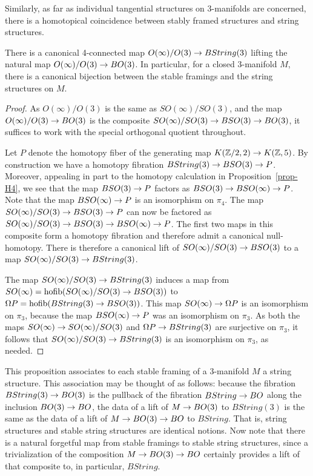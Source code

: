 \documentclass{amsart}
\begin{document}
Similarly, as far as individual tangential structures on 3-manifolds are concerned, there is a homotopical coincidence between stably framed structures and string structures.
\begin{proposition}
There is a canonical 4-connected map $O(\infty)/O(3) \rightarrow BString(3)$ lifting the natural map $O(\infty)/O(3) \rightarrow BO(3)$.  In particular, for a closed 3-manifold $M$, there is a canonical bijection between the stable framings and the string structures on $M$.
\end{proposition} 
\begin{proof}
As $O(\infty)/O(3)$ is the same as $SO(\infty)/SO(3)$, and the map $O(\infty)/O(3) \rightarrow BO(3)$ is the composite $SO(\infty)/SO(3) \rightarrow BSO(3) \rightarrow BO(3)$, it suffices to work with the special orthogonal quotient throughout.

Let $P$ denote the homotopy fiber of the generating map $K(\mathbb Z/2,2) \rightarrow K(\mathbb Z,5)$.  By construction we have a homotopy fibration $BString(3) \rightarrow BSO(3) \rightarrow P$.  Moreover, appealing in part to the homotopy calculation in Proposition~\ref{prop-H4}, we see that the map $BSO(3) \rightarrow P$ factors as $BSO(3) \rightarrow BSO(\infty) \rightarrow P$.  Note that the map $BSO(\infty) \rightarrow P$ is an isomorphism on $\pi_4$.  The map $SO(\infty)/SO(3) \rightarrow BSO(3) \rightarrow P$ can now be factored as $SO(\infty)/SO(3) \rightarrow BSO(3) \rightarrow BSO(\infty) \rightarrow P$.  The first two maps in this composite form a homotopy fibration and therefore admit a canonical null-homotopy.  There is therefore a canonical lift of $SO(\infty)/SO(3) \rightarrow BSO(3)$ to a map $SO(\infty)/SO(3) \rightarrow BString(3)$.

The map $SO(\infty)/SO(3) \rightarrow BString(3)$ induces a map from $SO(\infty) = \operatorname{hofib}(SO(\infty)/SO(3) \rightarrow BSO(3))$ to $\Omega P = \operatorname{hofib}(BString(3) \rightarrow BSO(3))$.  This map $SO(\infty) \rightarrow \Omega P$ is an isomorphism on $\pi_3$, because the map $BSO(\infty) \rightarrow P$ was an isomorphism on $\pi_3$.  As both the maps $SO(\infty) \rightarrow SO(\infty)/SO(3)$ and $\Omega P \rightarrow BString(3)$ are surjective on $\pi_3$, it follows that $SO(\infty)/SO(3) \rightarrow BString(3)$ is an isomorphism on $\pi_3$, as needed.
\end{proof}

This proposition associates to each stable framing of a 3-manifold $M$ a string structure.  This association may be thought of as follows: because the fibration $BString(3) \rightarrow BO(3)$ is the pullback of the fibration $BString \rightarrow BO$ along the inclusion $BO(3) \rightarrow BO$, the data of a lift of $M \rightarrow BO(3)$ to $BString(3)$ is the same as the data of a lift of $M \rightarrow BO(3) \rightarrow BO$ to $BString$.  That is, string structures and stable string structures are identical notions.  Now note that there is a natural forgetful map from stable framings to stable string structures, since a trivialization of the composition $M \rightarrow BO(3) \rightarrow BO$ certainly provides a lift of that composite to, in particular, $BString$.
\end{document}
